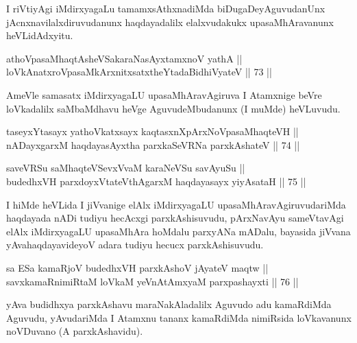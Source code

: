 \begin{artha}
I riVtiyAgi iMdirxyagaLu tamamxsAthxnadiMda biDugaDeyAguvudanUnx
jAcnxnavilalxdiruvudanunx haqdayadalilx elalxvudakukx upasaMhAravanunx
heVLidAdxyitu.
\end{artha}

\begin{shl}
athoVpasaMhaqtAsheVSakaraNasAyx\s \s tamxnoV yathA || \\
loVkAnatxroVpasaMkArxnitxsatxtheYtadaBidhiVyateV \hfill || 73 ||  
\end{shl}

\begin{artha}
AmeVle samasatx iMdirxyagaLU upasaMhAravAgiruva I Atamxnige beVre
loVkadalilx saMbaMdhavu heVge AguvudeMbudanunx (I muMde) heVLuvudu.
\end{artha}


\begin{shl}
taseyxYtasayx yathoVkatxsayx kaqtasxnXpArxNoVpasaMhaqteVH || \\
nADayxgarxM haqdayasAyxtha parxkaSeVRNa parxkAshateV \hfill || 74 ||  
\end{shl}

\begin{shl}
saveVRSu saMhaqteVSevxVvaM karaNeVSu savAyuSu ||  \\
budedhxVH parxdoyxVtateV\s thAgarxM haqdayasayx yiyAsataH \hfill || 75 ||  
\end{shl}

\begin{artha}
I hiMde heVLida I jiVvanige elAlx iMdirxyagaLU
upasaMhAravAgiruvudariMda haqdayada nADi tudiyu hecAcxgi
parxkAshisuvudu, pArxNavAyu sameVtavAgi elAlx iMdirxyagaLU upasaMhAra
hoMdalu parxyANa mADalu, bayasida jiVvana yAva\break haqdayavideyoV adara
tudiyu hecucx parxkAshisuvudu.
\end{artha}


\begin{shl}
sa ESa kamaRjoV budedhxVH parxkAshoV jAyateV maqtw || \\
savxkamaRnimiRtaM loVkaM yeVnA\s \s tAmx\s yaM parxpashayxti \hfill || 76 ||  
\end{shl}

\begin{artha}
yAva budidhxya parxkAshavu maraNakAladalilx Aguvudo adu kamaRdiMda
Aguvudu, yAvudariMda I Atamxnu tananx kamaRdiMda nimiRsida loVkavanunx
noVDuvano (A parxkAshavidu).
\end{artha}


